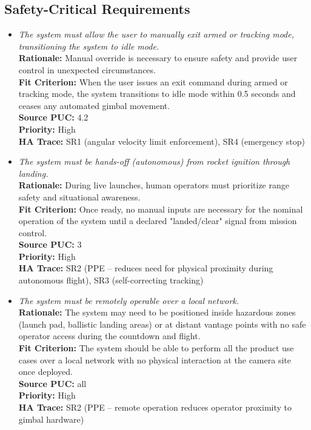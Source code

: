 \documentclass[12pt]{article}
\begin{document}
\subsection{Safety-Critical Requirements}
\begin{itemize}[leftmargin=*]
  \item[SCR-1] \emph{The system must allow the user to manually exit armed or tracking
          mode, transitioning the system to idle mode.}\\[2mm]
        \textbf{Rationale:} Manual override is necessary to ensure safety and provide user control in unexpected circumstances.\\
        \textbf{Fit Criterion:} When the user issues an exit command during armed or tracking mode, the system transitions to idle mode within 0.5 seconds and ceases any automated gimbal movement.\\
        \textbf{Source PUC:} 4.2 \\
        \textbf{Priority:} High \\
        \textbf{HA Trace:} SR1 (angular velocity limit enforcement), SR4 (emergency stop)

  \item[SCR-2] \emph{The system must be hands-off (autonomous) from rocket ignition
          through landing.}\\[2mm]
        \textbf{Rationale:} During live launches, human operators must prioritize range safety and situational awareness.\\
        \textbf{Fit Criterion:} Once ready, no manual inputs are necessary for the nominal operation of the system until a declared "landed/clear" signal from mission control.\\
        \textbf{Source PUC:} 3 \\
        \textbf{Priority:} High \\
        \textbf{HA Trace:} SR2 (PPE -- reduces need for physical proximity during autonomous flight), SR3 (self-correcting tracking)

  \item[SCR-3] \emph{The system must be remotely operable over a local network.}\\[2mm]
        \textbf{Rationale:} The system may need to be positioned inside hazardous zones (launch pad, ballistic landing areas) or at distant vantage points with no safe operator access during the countdown and flight.\\
        \textbf{Fit Criterion:} The system should be able to perform all the product use cases over a local network with no physical interaction at the camera site once deployed.\\
        \textbf{Source PUC:} all \\
        \textbf{Priority:} High \\
        \textbf{HA Trace:} SR2 (PPE -- remote operation reduces operator proximity to gimbal hardware)


\end{itemize}
\end{document}
